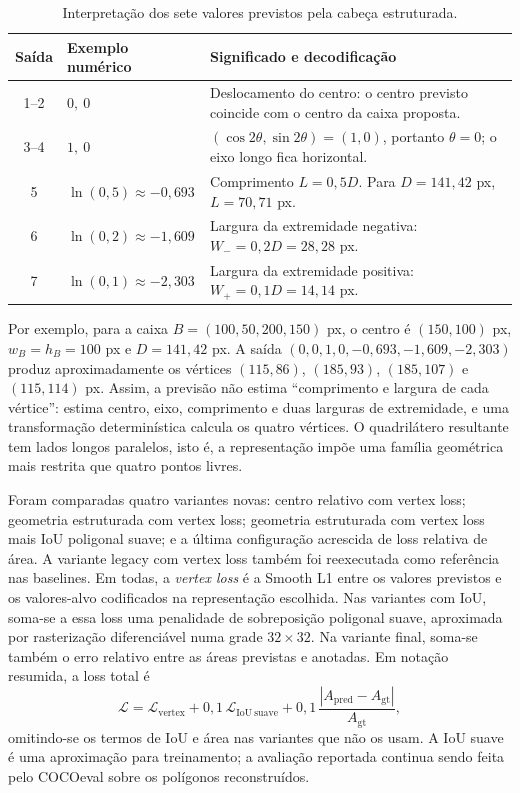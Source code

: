 \documentclass[11pt]{article}
\begin{document}
\begin{table}[H]
\centering
\caption{Interpretação dos sete valores previstos pela cabeça estruturada.}
\small
\begin{tabular}{clp{8.2cm}}
\toprule
Saída & Exemplo numérico & Significado e decodificação \\
\midrule
1--2 & $0,\ 0$ & Deslocamento do centro: o centro previsto coincide com o centro da caixa proposta. \\
3--4 & $1,\ 0$ & $(\cos2\theta,\sin2\theta)=(1,0)$, portanto $\theta=0$; o eixo longo fica horizontal. \\
5 & $\ln(0,5)\approx-0,693$ & Comprimento $L=0,5D$. Para $D=141,42$ px, $L=70,71$ px. \\
6 & $\ln(0,2)\approx-1,609$ & Largura da extremidade negativa: $W_-=0,2D=28,28$ px. \\
7 & $\ln(0,1)\approx-2,303$ & Largura da extremidade positiva: $W_+=0,1D=14,14$ px. \\
\bottomrule
\end{tabular}
\end{table}

Por exemplo, para a caixa $B=(100,50,200,150)$ px, o centro é $(150,100)$ px,
$w_B=h_B=100$ px e $D=141,42$ px. A saída
$(0,0,1,0,-0,693,-1,609,-2,303)$ produz aproximadamente os vértices
$(115,86)$, $(185,93)$, $(185,107)$ e $(115,114)$ px. Assim, a previsão não
estima “comprimento e largura de cada vértice”: estima centro, eixo, comprimento
e duas larguras de extremidade, e uma transformação determinística calcula os
quatro vértices. O quadrilátero resultante tem lados longos paralelos, isto é, a
representação impõe uma família geométrica mais restrita que quatro pontos livres.

Foram comparadas quatro variantes novas: centro relativo com vertex loss;
geometria estruturada com vertex loss; geometria estruturada com vertex loss mais
IoU poligonal suave; e a última configuração acrescida de loss relativa de área.
A variante legacy com vertex loss também foi reexecutada como referência nas
baselines. Em todas, a \textit{vertex loss} é a Smooth L1 entre os valores
previstos e os valores-alvo codificados na representação escolhida. Nas variantes
com IoU, soma-se a essa loss uma penalidade de sobreposição poligonal suave,
aproximada por rasterização diferenciável numa grade $32\times32$. Na variante
final, soma-se também o erro relativo entre as áreas previstas e anotadas. Em
notação resumida, a loss total é
\[
\mathcal{L}=\mathcal{L}_{\mathrm{vertex}}
+0{,}1\,\mathcal{L}_{\mathrm{IoU\ suave}}
+0{,}1\,\frac{|A_{\mathrm{pred}}-A_{\mathrm{gt}}|}{A_{\mathrm{gt}}},
\]
omitindo-se os termos de IoU e área nas variantes que não os usam. A IoU suave é
uma aproximação para treinamento; a avaliação reportada continua sendo feita pelo
COCOeval sobre os polígonos reconstruídos.
\end{document}
